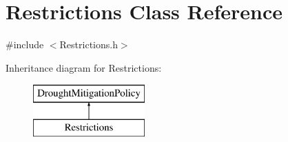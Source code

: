 \hypertarget{classRestrictions}{}\section{Restrictions Class Reference}
\label{classRestrictions}


{\ttfamily \#include $<$Restrictions.\+h$>$}

Inheritance diagram for Restrictions\+:\begin{figure}[H]
\begin{center}
\leavevmode
\includegraphics[height=2.000000cm]{classRestrictions}
\end{center}
\end{figure}
